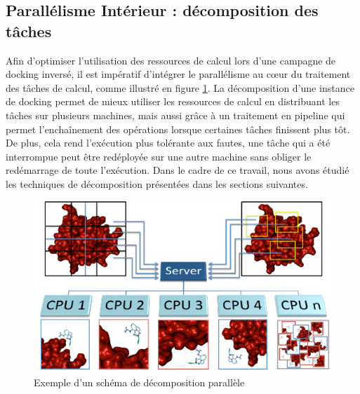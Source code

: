\subsection{Parallélisme Intérieur : décomposition des tâches}
Afin d'optimiser l'utilisation des ressources de calcul lors d'une campagne de docking inversé, il est impératif d'intégrer le parallélisme au cœur du traitement des tâches de calcul, comme illustré en figure \ref{fig:romain-fig1}. La décomposition d'une instance de docking permet de mieux utiliser les ressources de calcul en distribuant les tâches sur plusieurs machines, mais aussi grâce à un traitement en pipeline qui permet l'enchaînement des opérations lorsque certaines tâches finissent plus tôt. De plus, cela rend l'exécution plus tolérante aux fautes, une tâche qui a été interrompue peut être redéployée sur une autre machine sans obliger le redémarrage de toute l'exécution. Dans le cadre de ce travail, nous avons étudié les techniques de décomposition présentées dans les sections suivantes. 

\begin{figure}
	\begin{center}
		\includegraphics[width=0.85\linewidth]{images/Romain/fig1-color}
	\end{center}
	\caption{Exemple d'un schéma de décomposition parallèle}\label{fig:romain-fig1}
\end{figure}

